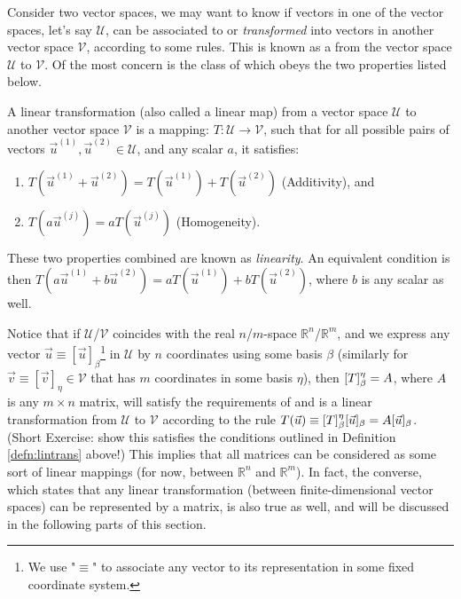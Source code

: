 Consider two vector spaces, we may want to know if vectors in one of the vector spaces, let's say $\mathcal{U}$, can be associated to or \textit{transformed} into vectors in another vector space $\mathcal{V}$, according to some rules. This is known as a  from the vector space $\mathcal{U}$ to $\mathcal{V}$. Of the most concern is the class of  which obeys the two properties listed below.
\begin{defn}
\label{defn:lintrans}
A linear transformation (also called a linear map) from a vector space $\mathcal{U}$ to another vector space $\mathcal{V}$ is a mapping: $T: \mathcal{U} \to \mathcal{V}$, such that for all possible pairs of vectors $\vec{u}^{(1)}, \vec{u}^{(2)} \in \mathcal{U}$, and any scalar $a$, it satisfies:
\begin{enumerate}
    \item $T(\vec{u}^{(1)} + \vec{u}^{(2)}) = T(\vec{u}^{(1)}) + T(\vec{u}^{(2)})$ (Additivity), and
    \item $T(a\vec{u}^{(j)}) = aT(\vec{u}^{(j)})$ (Homogeneity).
\end{enumerate}
These two properties combined are known as \textit{linearity}. An equivalent condition is then $T(a\vec{u}^{(1)} + b\vec{u}^{(2)}) = aT(\vec{u}^{(1)}) + bT(\vec{u}^{(2)})$, where $b$ is any scalar as well.
\end{defn}
Notice that if $\mathcal{U}$/$\mathcal{V}$ coincides with the real $n$/$m$-space $\mathbb{R}^n$/$\mathbb{R}^m$, and we express any vector $\vec{u} \equiv [\vec{u}]_\beta$\footnote{We use "$\equiv$" to associate any vector to its representation in some fixed coordinate system.} in $\mathcal{U}$ by $n$ coordinates using some basis $\mathcal{\beta}$ (similarly for $\vec{v} \equiv [\vec{v}]_{\eta} \in \mathcal{V}$ that has $m$ coordinates in some basis $\mathcal{\eta}$), then $\smash{[T]_\beta^{\eta}} = A$, where $A$ is any $m \times n$ matrix, will satisfy the requirements of and is a linear transformation from $\mathcal{U}$ to $\mathcal{V}$ according to the rule $T(\vec{u}) \equiv \smash{[T]_\beta^{\eta}}[\vec{u}]_\beta = A[\vec{u}]_\beta$. (Short Exercise: show this satisfies the conditions outlined in Definition \ref{defn:lintrans} above!\footnotemark) This implies that all matrices can be considered as some sort of linear mappings (for now, between $\mathbb{R}^n$ and $\mathbb{R}^m$). In fact, the converse, which states that any linear transformation (between finite-dimensional vector spaces) can be represented by a matrix, is also true as well, and will be discussed in the following parts of this section. \par
